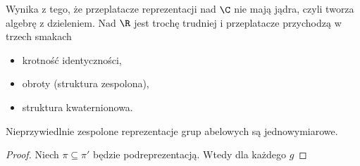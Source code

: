 Wynika z tego, że przeplatacze reprezentacji nad $\C$ nie mają jądra, czyli tworza algebrę z dzieleniem. Nad $\R$ jest trochę trudniej i przeplatacze przychodzą w trzech smakach
\begin{itemize}
  \item krotność identyczności,
  \item obroty (struktura zespolona),
  \item struktura kwaternionowa.
\end{itemize}

\begin{conclusion}{}{}
  Nieprzywiedlnie zespolone reprezentacje grup abelowych są jednowymiarowe.
\end{conclusion}

\begin{proof}
  Niech $\pi\subseteq \pi'$ będzie podreprezentacją. Wtedy dla każdego $g$ 
\end{proof}










